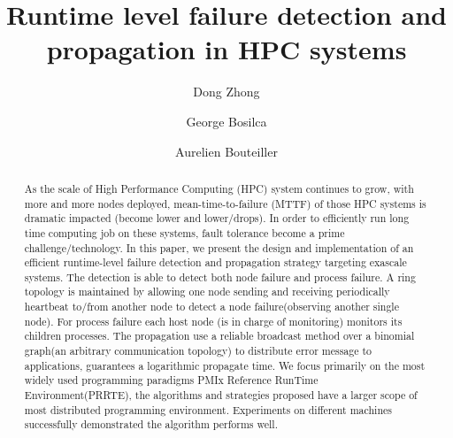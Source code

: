 \documentclass[sigconf]{acmart}
\begin{document}
%
\title{Runtime level failure detection and propagation in HPC systems}

%
\author{Dong Zhong}
\authornotemark[1]

\author{George Bosilca}

\author{Aurelien Bouteiller}

%
\renewcommand{\shortauthors}{Dong and Aurelien, et al.}

%
\begin{abstract}
As the scale of High Performance Computing (HPC) system continues to grow, with more and more nodes deployed, mean-time-to-failure (MTTF) of those HPC systems is dramatic impacted (become lower and lower/drops). In order to efficiently run long time computing job on these systems, fault tolerance become a prime challenge/technology. In this paper, we present the design and implementation of an efficient runtime-level failure detection and propagation strategy targeting exascale systems. The detection is able to detect both node failure and process failure. A ring topology is maintained by allowing one node sending and receiving periodically heartbeat to/from another node to detect a node failure(observing another single node). For process failure each host node (is in charge of monitoring) monitors its children processes. The propagation use a reliable broadcast method over a binomial graph(an arbitrary communication topology) to distribute error message to applications, guarantees a logarithmic propagate time. We focus primarily on the most widely used programming paradigms PMIx Reference RunTime Environment(PRRTE), the algorithms and strategies proposed have a larger scope of most distributed programming environment. Experiments on different machines successfully demonstrated the algorithm performs well.
\end{abstract}
\end{document}
